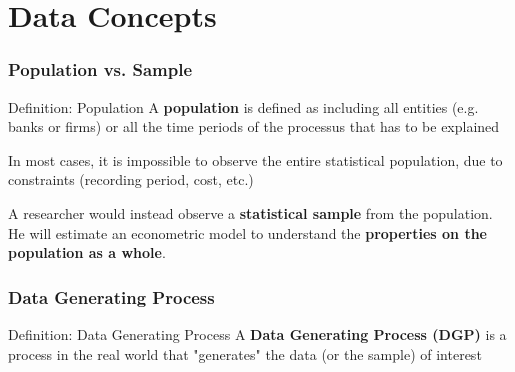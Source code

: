 \documentclass{beamer}
\newenvironment{wideitemize}{\itemize\addtolength{\itemsep}{10pt}}{\enditemize}
\begin{document}
\section{Data Concepts}
\begin{frame}
  \frametitle{Population vs. Sample}

  \begin{block}{Definition: Population}
    A \textbf{population} is defined as including all entities (e.g. banks or firms) or all the time periods of the processus that has to be explained
  \end{block}

\smallskip
  
  \begin{wideitemize}
    \item In most cases, it is impossible to observe the entire statistical population, due to constraints (recording period, cost, etc.)
    \item A researcher would instead observe a \textbf{statistical sample} from the population. He will estimate an econometric model to understand the \textbf{properties on the population as a whole}.
  \end{wideitemize} 
\end{frame}


\begin{frame}
  \frametitle{Data Generating Process}
  
  \begin{block}{Definition: Data Generating Process}
    A \textbf{Data Generating Process (DGP)} is a process in the real world that "generates" the data (or the sample) of interest
  \end{block}

\end{frame}
\end{document}
